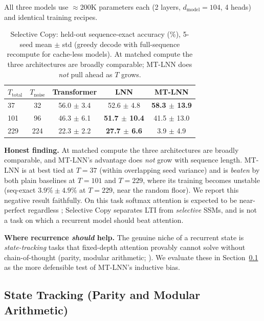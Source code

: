 \documentclass[11pt]{article}
\theoremstyle{definition}
\begin{document}
All three models use $\approx$200K parameters each (2 layers, $d_\text{model}=104$, 4 heads) and identical training recipes.

\begin{table}[h]
\centering
\caption{Selective Copy: held-out sequence-exact accuracy (\%), 5-seed mean $\pm$ std (greedy decode with full-sequence recompute for cache-less models). At matched compute the three architectures are broadly comparable; MT-LNN does \emph{not} pull ahead as $T$ grows.}
\label{tab:long_ctx}
\begin{tabular}{lcccc}
\toprule
$T_\text{total}$ & $T_\text{noise}$ & Transformer & LNN & MT-LNN \\
\midrule
37   &  32 & 56.0 $\pm$ 3.4 & 52.6 $\pm$ 4.8 & \textbf{58.3 $\pm$ 13.9} \\
101  &  96 & 46.3 $\pm$ 6.1 & \textbf{51.7 $\pm$ 10.4} & 41.5 $\pm$ 13.0 \\
229  & 224 & 22.3 $\pm$ 2.2 & \textbf{27.7 $\pm$ 6.6} &  3.9 $\pm$ 4.9 \\
\bottomrule
\end{tabular}
\end{table}

\textbf{Honest finding.} At matched compute the three architectures are broadly comparable, and MT-LNN's advantage does \emph{not} grow with sequence length. MT-LNN is at best tied at $T=37$ (within overlapping seed variance) and is \emph{beaten} by both plain baselines at $T=101$ and $T=229$, where its training becomes unstable (seq-exact $3.9\% \pm 4.9\%$ at $T=229$, near the random floor). We report this negative result faithfully. On this task softmax attention is expected to be near-perfect regardless \citep{gu2023mamba}; Selective Copy separates LTI from \emph{selective} SSMs, and is not a task on which a recurrent model should beat attention.

\textbf{Where recurrence \emph{should} help.} The genuine niche of a recurrent state is \emph{state-tracking} tasks that fixed-depth attention provably cannot solve without chain-of-thought (parity, modular arithmetic; \citealt{hahn2020theoretical, merrill2023parallelism}). We evaluate these in Section~\ref{sec:state_tracking} as the more defensible test of MT-LNN's inductive bias.

\subsection{State Tracking (Parity and Modular Arithmetic)}
\label{sec:state_tracking}
\end{document}
